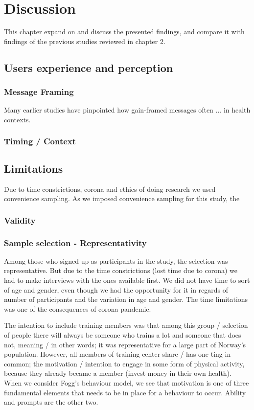 \chapter{Discussion}
This chapter expand on and discuss the presented findings, and compare it with findings of the previous studies reviewed in chapter 2. 

\section{Users experience and perception}
\subsection{Message Framing}
Many earlier studies have pinpointed how gain-framed messages often ... in health contexts. 

\subsection{Timing / Context}

\section{Limitations}
Due to time constrictions, corona and ethics of doing research we used convenience sampling. As we imposed convenience sampling for this study, the 

\subsection{Validity}

\subsection{Sample selection - Representativity}
Among those who signed up as participants in the study, the selection was representative. But due to the time constrictions (lost time due to corona) we had to make interviews with the ones available first. We did not have time to sort of age and gender, even though we had the opportunity for it in regards of number of participants and the variation in age and gender. The time limitations was one of the consequences of corona pandemic. 

The intention to include training members was that among this group / selection of people there will always be someone who trains a lot and someone that does not, meaning / in other words; it was representative for a large part of Norway's population. However, all members of training center share / has one ting in common; the motivation / intention to engage in some form of physical activity, because they already became a member (invest money in their own health). When we consider Fogg's behaviour model, we see that motivation is one of three fundamental elements that needs to be in place for a behaviour to occur. Ability and prompts are the other two. 

